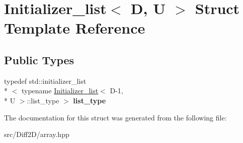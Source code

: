 \hypertarget{structInitializer__list}{\section{Initializer\-\_\-list$<$ D, U $>$ Struct Template Reference}
\label{structInitializer__list}
}
\subsection*{Public Types}
\begin{DoxyCompactItemize}
\item 
\hypertarget{structInitializer__list_ae28944fda227672ee3e7bac608a7b30a}{typedef std\-::initializer\-\_\-list\\*
$<$ typename \hyperlink{structInitializer__list}{Initializer\-\_\-list}$<$ D-\/1, \\*
U $>$\-::list\-\_\-type $>$ {\bfseries list\-\_\-type}}\label{structInitializer__list_ae28944fda227672ee3e7bac608a7b30a}

\end{DoxyCompactItemize}


The documentation for this struct was generated from the following file\-:\begin{DoxyCompactItemize}
\item 
src/\-Diff2\-D/array.\-hpp\end{DoxyCompactItemize}
